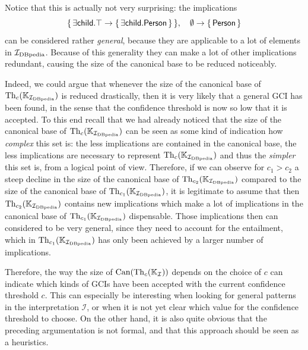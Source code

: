 Notice that this is actually not very surprising: the implications
\begin{equation*}
  {\ensuremath{\{\, \mathsf{\exists  child. \top} \to {\ensuremath{\{\, \mathsf{\exists child. Person} \,\}}} \,\}}}, \quad
  \emptyset \to {\ensuremath{\{\, \mathsf{Person} \,\}}}
\end{equation*}
can be considered rather \emph{general}, because they are applicable to a lot of elements
in ${\mathcal{I}_{\text{DBpedia}}}$.  Because of this generality they can make a lot of other implications
redundant, causing the size of the canonical base to be reduced noticeably.

Indeed, we could argue that whenever the size of the canonical base of $\operatorname{Th}_c({\mathbb{K}}_{{\mathcal{I}_{\text{DBpedia}}}})$ is reduced drastically, then it is very likely that a general GCI has been
found, in the sense that the confidence threshold is now so low that it is accepted.  To
this end recall that we had already noticed that the size of the canonical base of
$\operatorname{Th}_c({\mathbb{K}}_{{\mathcal{I}_{\text{DBpedia}}}})$ can be seen as some kind of indication how \emph{complex} this
set is: the less implications are contained in the canonical base, the less implications
are necessary to represent $\operatorname{Th}_c({\mathbb{K}}_{\mathcal{I}_{\text{DBpedia}}})$ and thus the \emph{simpler} this set
is, from a logical point of view.  Therefore, if we can observe for $c_1 > c_2$ a steep
decline in the size of the canonical base of $\operatorname{Th}_{c_2}({\mathbb{K}}_{{\mathcal{I}_{\text{DBpedia}}}})$ compared to
the size of the canonical base of $\operatorname{Th}_{c_1}({\mathbb{K}}_{{\mathcal{I}_{\text{DBpedia}}}})$, it is legitimate to
assume that then $\operatorname{Th}_{c_2}({\mathbb{K}}_{{\mathcal{I}_{\text{DBpedia}}}})$ contains new implications which make a
lot of implications in the canonical base of $\operatorname{Th}_{c_1}({\mathbb{K}}_{\mathcal{I}_{\text{DBpedia}}})$ dispensable.
Those implications then can considered to be very general, since they need to account for
the entailment, which in $\operatorname{Th}_{c_1}({\mathbb{K}}_{\mathcal{I}_{\text{DBpedia}}})$ has only been achieved by a larger
number of implications.

Therefore, the way the size of $\operatorname{Can}(\operatorname{Th}_c({\mathbb{K}}_{\mathcal{I}}))$ depends on the choice
of $c$ can indicate which kinds of GCIs have been accepted with the current confidence
threshold $c$.  This can especially be interesting when looking for general patterns in
the interpretation $\mathcal{I}$, or when it is not yet clear which value for the
confidence threshold to choose.  On the other hand, it is also quite obvious that the
preceding argumentation is not formal, and that this approach should be seen as a
heuristics.

